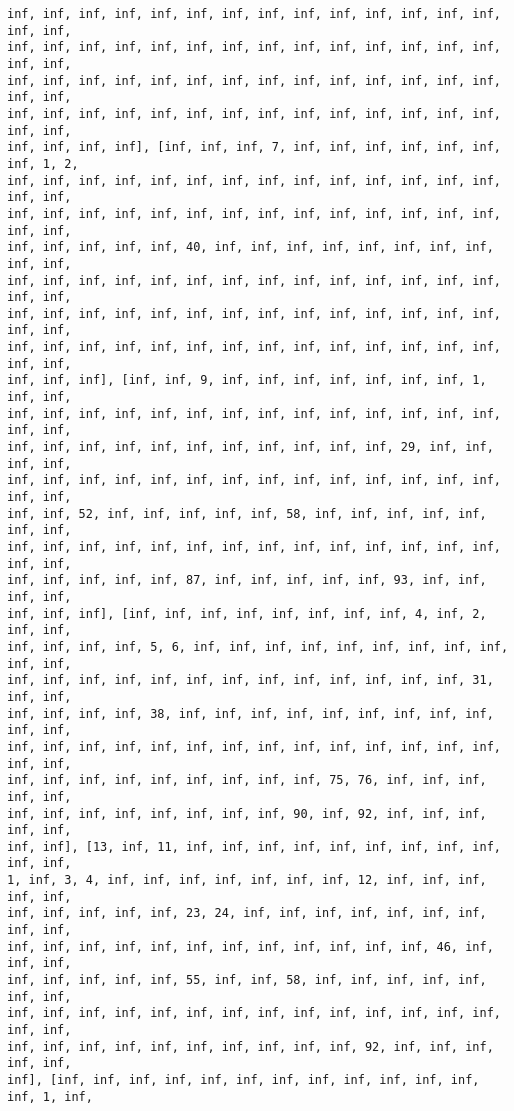 \documentclass[11pt]{article}
\begin{document}
\begin{Verbatim}[commandchars=\\\{\}]
inf, inf, inf, inf, inf, inf, inf, inf, inf, inf, inf, inf, inf, inf, inf, inf,
inf, inf, inf, inf, inf, inf, inf, inf, inf, inf, inf, inf, inf, inf, inf, inf,
inf, inf, inf, inf, inf, inf, inf, inf, inf, inf, inf, inf, inf, inf, inf, inf,
inf, inf, inf, inf, inf, inf, inf, inf, inf, inf, inf, inf, inf, inf, inf, inf,
inf, inf, inf, inf], [inf, inf, inf, 7, inf, inf, inf, inf, inf, inf, inf, 1, 2,
inf, inf, inf, inf, inf, inf, inf, inf, inf, inf, inf, inf, inf, inf, inf, inf,
inf, inf, inf, inf, inf, inf, inf, inf, inf, inf, inf, inf, inf, inf, inf, inf,
inf, inf, inf, inf, inf, 40, inf, inf, inf, inf, inf, inf, inf, inf, inf, inf,
inf, inf, inf, inf, inf, inf, inf, inf, inf, inf, inf, inf, inf, inf, inf, inf,
inf, inf, inf, inf, inf, inf, inf, inf, inf, inf, inf, inf, inf, inf, inf, inf,
inf, inf, inf, inf, inf, inf, inf, inf, inf, inf, inf, inf, inf, inf, inf, inf,
inf, inf, inf], [inf, inf, 9, inf, inf, inf, inf, inf, inf, inf, 1, inf, inf,
inf, inf, inf, inf, inf, inf, inf, inf, inf, inf, inf, inf, inf, inf, inf, inf,
inf, inf, inf, inf, inf, inf, inf, inf, inf, inf, inf, 29, inf, inf, inf, inf,
inf, inf, inf, inf, inf, inf, inf, inf, inf, inf, inf, inf, inf, inf, inf, inf,
inf, inf, 52, inf, inf, inf, inf, inf, 58, inf, inf, inf, inf, inf, inf, inf,
inf, inf, inf, inf, inf, inf, inf, inf, inf, inf, inf, inf, inf, inf, inf, inf,
inf, inf, inf, inf, inf, 87, inf, inf, inf, inf, inf, 93, inf, inf, inf, inf,
inf, inf, inf], [inf, inf, inf, inf, inf, inf, inf, inf, 4, inf, 2, inf, inf,
inf, inf, inf, inf, 5, 6, inf, inf, inf, inf, inf, inf, inf, inf, inf, inf, inf,
inf, inf, inf, inf, inf, inf, inf, inf, inf, inf, inf, inf, inf, 31, inf, inf,
inf, inf, inf, inf, 38, inf, inf, inf, inf, inf, inf, inf, inf, inf, inf, inf,
inf, inf, inf, inf, inf, inf, inf, inf, inf, inf, inf, inf, inf, inf, inf, inf,
inf, inf, inf, inf, inf, inf, inf, inf, inf, 75, 76, inf, inf, inf, inf, inf,
inf, inf, inf, inf, inf, inf, inf, inf, 90, inf, 92, inf, inf, inf, inf, inf,
inf, inf], [13, inf, 11, inf, inf, inf, inf, inf, inf, inf, inf, inf, inf, inf,
1, inf, 3, 4, inf, inf, inf, inf, inf, inf, inf, 12, inf, inf, inf, inf, inf,
inf, inf, inf, inf, inf, 23, 24, inf, inf, inf, inf, inf, inf, inf, inf, inf,
inf, inf, inf, inf, inf, inf, inf, inf, inf, inf, inf, inf, 46, inf, inf, inf,
inf, inf, inf, inf, inf, 55, inf, inf, 58, inf, inf, inf, inf, inf, inf, inf,
inf, inf, inf, inf, inf, inf, inf, inf, inf, inf, inf, inf, inf, inf, inf, inf,
inf, inf, inf, inf, inf, inf, inf, inf, inf, inf, 92, inf, inf, inf, inf, inf,
inf], [inf, inf, inf, inf, inf, inf, inf, inf, inf, inf, inf, inf, inf, 1, inf,

\end{Verbatim}
\end{document}
